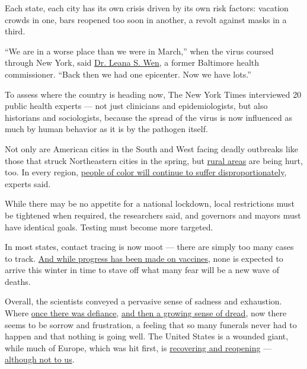 Each state, each city has its own crisis driven by its own risk factors:
vacation crowds in one, bars reopened too soon in another, a revolt
against masks in a third.

``We are in a worse place than we were in March,'' when the virus
coursed through New York, said
\href{https://www.gwumc.edu/smhs/facultydirectory/profile.cfm?empName=Leana\%20Wen\&FacID=2073685428}{Dr.
Leana S. Wen}, a former Baltimore health commissioner. ``Back then we
had one epicenter. Now we have lots.''

To assess where the country is heading now, The New York Times
interviewed 20 public health experts --- not just clinicians and
epidemiologists, but also historians and sociologists, because the
spread of the virus is now influenced as much by human behavior as it is
by the pathogen itself.

Not only are American cities in the South and West facing deadly
outbreaks like those that struck Northeastern cities in the spring, but
\href{https://www.nytimes.com/2020/07/14/us/coronavirus-texas-rio-grande-valley-border.html}{rural
areas} are being hurt, too. In every region,
\href{https://www.nytimes.com/interactive/2020/07/05/us/coronavirus-latinos-african-americans-cdc-data.html}{people
of color will continue to suffer disproportionately}, experts said.

While there may be no appetite for a national lockdown, local
restrictions must be tightened when required, the researchers said, and
governors and mayors must have identical goals. Testing must become more
targeted.

In most states, contact tracing is now moot --- there are simply too
many cases to track.
\href{https://www.nytimes.com/interactive/2020/science/coronavirus-vaccine-tracker.html}{And
while progress has been made on vaccines}, none is expected to arrive
this winter in time to stave off what many fear will be a new wave of
deaths.

Overall, the scientists conveyed a pervasive sense of sadness and
exhaustion. Where
\href{https://www.nytimes.com/2020/03/22/health/coronavirus-restrictions-us.html}{once
there was defiance},
\href{https://www.nytimes.com/2020/04/18/health/coronavirus-america-future.html}{and
then a growing sense of dread}, now there seems to be sorrow and
frustration, a feeling that so many funerals never had to happen and
that nothing is going well. The United States is a wounded giant, while
much of Europe, which was hit first, is
\href{https://www.nytimes.com/2020/07/14/business/europe-consumer-spending.html}{recovering
and reopening} ---
\href{https://www.nytimes.com/article/eu-travel-ban-explained-usa.html}{although
not to us}.

